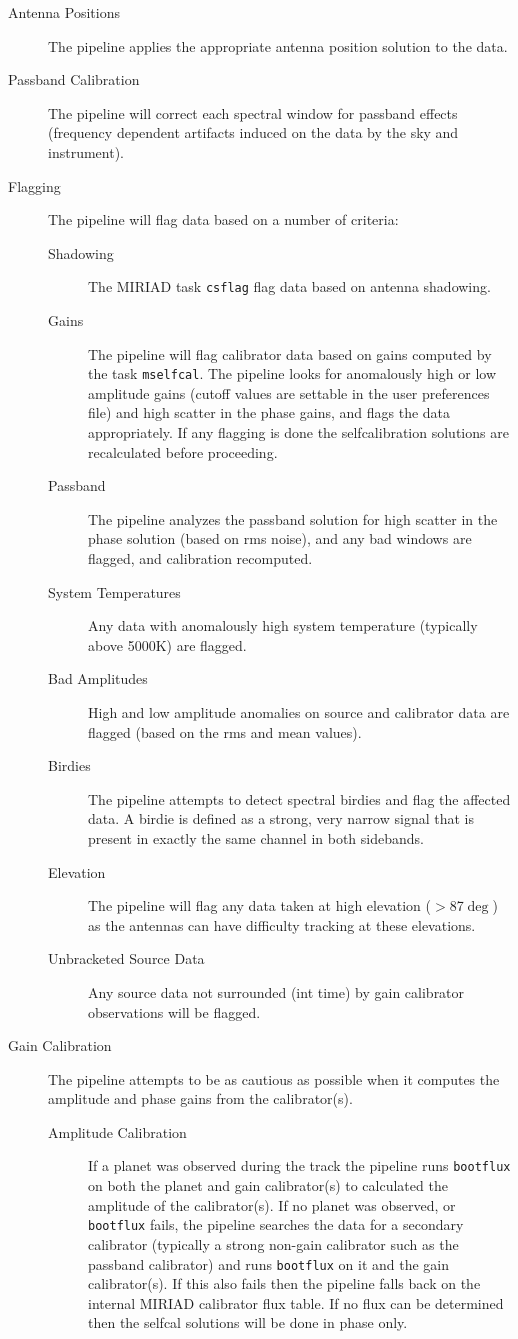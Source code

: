 \begin{description}
\item[Antenna Positions] The pipeline applies the appropriate antenna position solution to the data.
\item[Passband Calibration] The pipeline will correct each spectral window for passband effects (frequency dependent artifacts induced on the data by the sky and instrument).
\item[Flagging] The pipeline will flag data based on a number of criteria:
\begin{description}
\item[Shadowing] The MIRIAD task \verb#csflag# flag data based on antenna shadowing.
\item[Gains] The pipeline will flag calibrator data based on gains computed by the task \verb#mselfcal#. The pipeline looks for anomalously high or low amplitude gains (cutoff values are settable in the user preferences file) and high scatter in the phase gains, and flags the data appropriately. If any flagging is done the selfcalibration solutions are recalculated before proceeding.
\item[Passband] The pipeline analyzes the passband solution for high scatter in the phase solution (based on rms noise), and any bad windows are flagged, and calibration recomputed.
\item[System Temperatures] Any data with anomalously high system temperature (typically above 5000K) are flagged.
\item[Bad Amplitudes] High and low amplitude anomalies on source and calibrator data are flagged (based on the rms and mean values).
\item[Birdies] The pipeline attempts to detect spectral birdies and flag the affected data. A birdie is defined as a strong, very narrow signal that is present in exactly the same channel in both sidebands.
\item[Elevation] The pipeline will flag any data taken at high elevation ($>$87$\deg$) as the antennas can have difficulty tracking at these elevations.
\item[Unbracketed Source Data] Any source data not surrounded (int time) by gain calibrator observations will be flagged.
\end{description}
\item[Gain Calibration] The pipeline attempts to be as cautious as possible when it computes the amplitude and phase gains from the calibrator(s).
\begin{description}
\item[Amplitude Calibration] If a planet was observed during the track the pipeline runs \verb#bootflux# on both the planet and gain calibrator(s) to calculated the amplitude of the calibrator(s). If no planet was observed, or \verb#bootflux# fails, the pipeline searches the data for a secondary calibrator (typically a strong non-gain calibrator such as the passband calibrator) and runs \verb#bootflux# on it and the gain calibrator(s). If this also fails then the pipeline falls back on the internal MIRIAD calibrator flux table. If no flux can be determined then the selfcal solutions will be done in phase only.

\end{description}
\end{description}
